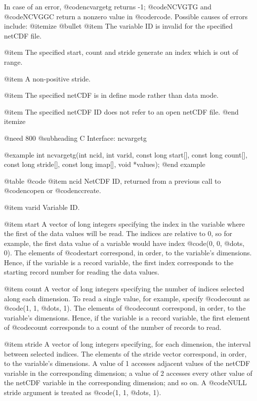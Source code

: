 In case of an error, @code{ncvargetg} returns -1; @code{NCVGTG} and
@code{NCVGGC} return a nonzero value in @code{rcode}.  Possible causes
of errors include:
@itemize @bullet
@item
The variable ID is invalid for the specified netCDF file.

@item
The specified start, count and stride generate an index which is out of range.

@item
A non-positive stride.

@item
The specified netCDF is in define mode rather than data mode.

@item
The specified netCDF ID does not refer to an open netCDF file.
@end itemize

@need 800
@subheading C Interface:  ncvargetg

@example
int ncvargetg(int ncid, int varid, const long start[], const long count[],
              const long stride[], const long imap[], void *values);
@end example

@table @code
@item ncid
NetCDF ID, returned from a previous call to @code{ncopen} or
@code{nccreate}.

@item varid
Variable ID.

@item start
A vector of long integers specifying the index in the variable where the
first of the data values will be read.  The indices are relative to 0,
so for example, the first data value of a variable would have index
@code{(0, 0, @dots{}, 0)}.  The elements of @code{start}
correspond, in order, to the variable's dimensions.  Hence, if the
variable is a record variable, the first index corresponds to the
starting record number for reading the data values.

@item count
A vector of long integers specifying the number of indices selected along each
dimension.  To read
a single value, for example, specify @code{count} as @code{(1, 1,
@dots{}, 1)}.  The elements of @code{count} correspond, in order, to the
variable's dimensions.  Hence, if the variable is a record variable, the
first element of @code{count} corresponds to a count of the number of
records to read.

@item stride
A vector of long integers specifying, for each dimension, the interval
between selected indices.  The elements of the
stride vector correspond, in order, to the variable's dimensions.  A
value of 1 accesses adjacent values of the netCDF variable in the
corresponding dimension; a value of 2 accesses every other value of the
netCDF variable in the corresponding dimension; and so on.  A
@code{NULL} stride argument is treated as @code{(1, 1, @dots{}, 1)}.

